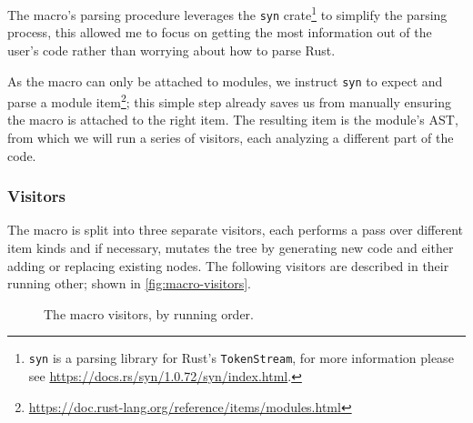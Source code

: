 The macro's parsing procedure leverages the \texttt{syn} crate\footnote{\texttt{syn} is a parsing library for Rust's \texttt{TokenStream},
    for more information please see \url{https://docs.rs/syn/1.0.72/syn/index.html}.} to simplify the parsing process,
this allowed me to focus on getting the most information out of the user's code rather than worrying about how to parse Rust.

As the \textcolor{attrgreen}{} macro can only be attached to modules,
we instruct \texttt{syn} to expect and parse a module item\footnote{\url{https://doc.rust-lang.org/reference/items/modules.html}};
this simple step already saves us from manually ensuring the macro is attached to the right item.
The resulting item is the module's \gls{AST}, from which we will run a series of visitors,
each analyzing a different part of the code. %

\subsubsection{Visitors}\label{sec:macro-dsl:architecture:visitors}

The macro is split into three separate visitors, each performs a pass over different item kinds and if necessary,
mutates the tree by generating new code and either adding or replacing existing nodes.
The following visitors are described in their running other; shown in \autoref{fig:macro-visitors}.

\begin{figure}
    \centering
    \caption{The \textcolor{attrgreen}{} macro visitors, by running order.}
    \label{fig:macro-visitors}
\end{figure}

